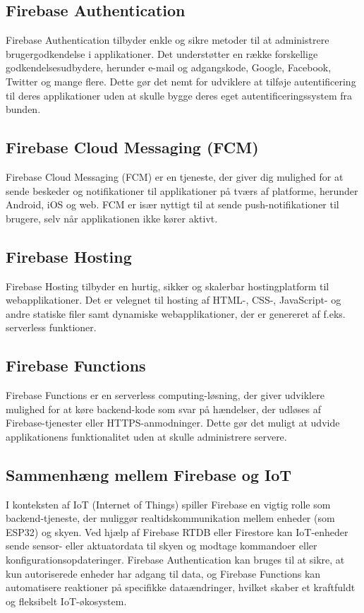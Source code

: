 \documentclass[12pt,a4paper]{book}
\begin{document}
	\subsection*{Firebase Authentication}
	Firebase Authentication tilbyder enkle og sikre metoder til at administrere brugergodkendelse i applikationer. Det understøtter en række forskellige godkendelsesudbydere, herunder e-mail og adgangskode, Google, Facebook, Twitter og mange flere. Dette gør det nemt for udviklere at tilføje autentificering til deres applikationer uden at skulle bygge deres eget autentificeringssystem fra bunden.
	
	\subsection*{Firebase Cloud Messaging (FCM)}
	Firebase Cloud Messaging (FCM) er en tjeneste, der giver dig mulighed for at sende beskeder og notifikationer til applikationer på tværs af platforme, herunder Android, iOS og web. FCM er især nyttigt til at sende push-notifikationer til brugere, selv når applikationen ikke kører aktivt.
	
	\subsection*{Firebase Hosting}
	Firebase Hosting tilbyder en hurtig, sikker og skalerbar hostingplatform til webapplikationer. Det er velegnet til hosting af HTML-, CSS-, JavaScript- og andre statiske filer samt dynamiske webapplikationer, der er genereret af f.eks. serverless funktioner.
	
	\subsection*{Firebase Functions}
	Firebase Functions er en serverless computing-løsning, der giver udviklere mulighed for at køre backend-kode som svar på hændelser, der udløses af Firebase-tjenester eller HTTPS-anmodninger. Dette gør det muligt at udvide applikationens funktionalitet uden at skulle administrere servere.
	
	\subsection*{Sammenhæng mellem Firebase og IoT}
	I konteksten af IoT (Internet of Things) spiller Firebase en vigtig rolle som backend-tjeneste, der muliggør realtidskommunikation mellem enheder (som ESP32) og skyen. Ved hjælp af Firebase RTDB eller Firestore kan IoT-enheder sende sensor- eller aktuatordata til skyen og modtage kommandoer eller konfigurationsopdateringer. Firebase Authentication kan bruges til at sikre, at kun autoriserede enheder har adgang til data, og Firebase Functions kan automatisere reaktioner på specifikke dataændringer, hvilket skaber et kraftfuldt og fleksibelt IoT-økosystem.
	
\end{document}
